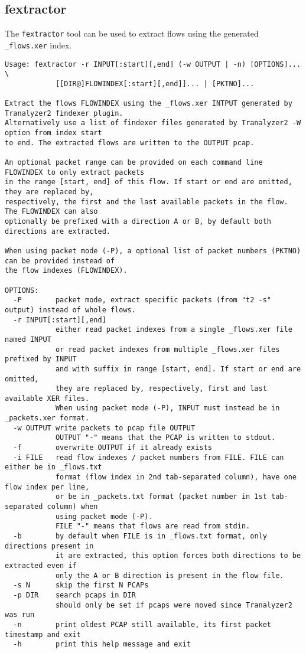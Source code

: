 \documentclass[documentation]{subfiles}
\begin{document}
\subsection{fextractor}

The {\tt fextractor} tool can be used to extract flows using the generated {\tt \_flows.xer} index.

\begin{small}
\begin{verbatim}
Usage: fextractor -r INPUT[:start][,end] (-w OUTPUT | -n) [OPTIONS]... \
            [[DIR@]FLOWINDEX[:start][,end]]... | [PKTNO]...

Extract the flows FLOWINDEX using the _flows.xer INTPUT generated by Tranalyzer2 findexer plugin.
Alternatively use a list of findexer files generated by Tranalyzer2 -W option from index start
to end. The extracted flows are written to the OUTPUT pcap.

An optional packet range can be provided on each command line FLOWINDEX to only extract packets
in the range [start, end] of this flow. If start or end are omitted, they are replaced by,
respectively, the first and the last available packets in the flow. The FLOWINDEX can also
optionally be prefixed with a direction A or B, by default both directions are extracted.

When using packet mode (-P), a optional list of packet numbers (PKTNO) can be provided instead of
the flow indexes (FLOWINDEX).

OPTIONS:
  -P        packet mode, extract specific packets (from "t2 -s" output) instead of whole flows.
  -r INPUT[:start][,end]
            either read packet indexes from a single _flows.xer file named INPUT
            or read packet indexes from multiple _flows.xer files prefixed by INPUT
            and with suffix in range [start, end]. If start or end are omitted,
            they are replaced by, respectively, first and last available XER files.
            When using packet mode (-P), INPUT must instead be in _packets.xer format.
  -w OUTPUT write packets to pcap file OUTPUT
            OUTPUT "-" means that the PCAP is written to stdout.
  -f        overwrite OUTPUT if it already exists
  -i FILE   read flow indexes / packet numbers from FILE. FILE can either be in _flows.txt
            format (flow index in 2nd tab-separated column), have one flow index per line,
            or be in _packets.txt format (packet number in 1st tab-separated column) when
            using packet mode (-P).
            FILE "-" means that flows are read from stdin.
  -b        by default when FILE is in _flows.txt format, only directions present in
            it are extracted, this option forces both directions to be extracted even if
            only the A or B direction is present in the flow file.
  -s N      skip the first N PCAPs
  -p DIR    search pcaps in DIR
            should only be set if pcaps were moved since Tranalyzer2 was run
  -n        print oldest PCAP still available, its first packet timestamp and exit
  -h        print this help message and exit
\end{verbatim}
\end{small}
\end{document}

